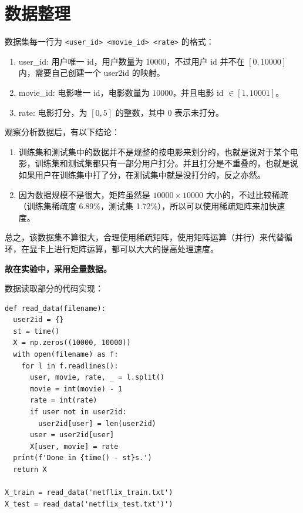 \documentclass[degree=project, degree-type=project]{thuthesis}
\begin{document}
\maketitle

\frontmatter
% 

\tableofcontents

\mainmatter

\chapter{数据整理}

数据集每一行为 \texttt{<user\_id> <movie\_id> <rate>} 的格式：

\begin{enumerate}
  \item user\_id: 用户唯一 id，用户数量为 $10000$，不过用户 id 并不在 $[0, 10000]$ 内，需要自己创建一个 user2id 的映射。
  \item movie\_id: 电影唯一 id，电影数量为 $10000$，并且电影 id $\in [1, 10001]$。
  \item rate: 电影打分，为 $[0, 5]$ 的整数，其中 $0$ 表示未打分。
\end{enumerate}

观察分析数据后，有以下结论：

\begin{enumerate}
  \item 训练集和测试集中的数据并不是规整的按电影来划分的，也就是说对于某个电影，训练集和测试集都只有一部分用户打分。并且打分是不重叠的，也就是说如果用户在训练集中打了分，在测试集中就是没打分的，反之亦然。
  \item 因为数据规模不是很大，矩阵虽然是 $10000 \times 10000$ 大小的，不过比较稀疏（训练集稀疏度 6.89\%，测试集 1.72\%），所以可以使用稀疏矩阵来加快速度。
\end{enumerate}

总之，该数据集不算很大，合理使用稀疏矩阵，使用矩阵运算（并行）来代替循环，在显卡上进行矩阵运算，都可以大大的提高处理速度。

\textbf{故在实验中，采用全量数据。}

数据读取部分的代码实现：

  \begin{verbatim}
def read_data(filename):
  user2id = {}
  st = time()
  X = np.zeros((10000, 10000))
  with open(filename) as f:
    for l in f.readlines():
      user, movie, rate, _ = l.split()
      movie = int(movie) - 1
      rate = int(rate)
      if user not in user2id:
        user2id[user] = len(user2id)
      user = user2id[user]
      X[user, movie] = rate
  print(f'Done in {time() - st}s.')
  return X

X_train = read_data('netflix_train.txt')
X_test = read_data('netflix_test.txt')')
  \end{verbatim}
\end{document}
